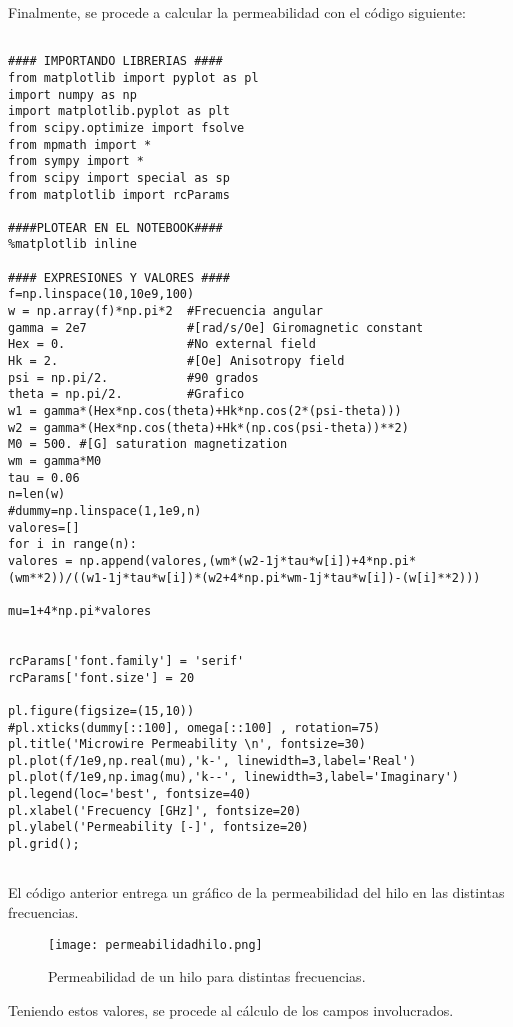 \documentclass[12pt,letterpaper]{article}
\numberwithin{equation}{section}
\begin{document}
Finalmente, se procede a calcular la permeabilidad con el código siguiente:

\begin{lstlisting}

#### IMPORTANDO LIBRERIAS ####
from matplotlib import pyplot as pl
import numpy as np
import matplotlib.pyplot as plt
from scipy.optimize import fsolve
from mpmath import *
from sympy import *
from scipy import special as sp
from matplotlib import rcParams

####PLOTEAR EN EL NOTEBOOK####
%matplotlib inline

#### EXPRESIONES Y VALORES ####
f=np.linspace(10,10e9,100) 
w = np.array(f)*np.pi*2  #Frecuencia angular
gamma = 2e7              #[rad/s/Oe] Giromagnetic constant
Hex = 0.                 #No external field
Hk = 2.                  #[Oe] Anisotropy field
psi = np.pi/2.           #90 grados
theta = np.pi/2.         #Grafico
w1 = gamma*(Hex*np.cos(theta)+Hk*np.cos(2*(psi-theta)))
w2 = gamma*(Hex*np.cos(theta)+Hk*(np.cos(psi-theta))**2)
M0 = 500. #[G] saturation magnetization
wm = gamma*M0
tau = 0.06               
n=len(w)
#dummy=np.linspace(1,1e9,n)
valores=[]
for i in range(n):
valores = np.append(valores,(wm*(w2-1j*tau*w[i])+4*np.pi*(wm**2))/((w1-1j*tau*w[i])*(w2+4*np.pi*wm-1j*tau*w[i])-(w[i]**2)))

mu=1+4*np.pi*valores


rcParams['font.family'] = 'serif'
rcParams['font.size'] = 20

pl.figure(figsize=(15,10))
#pl.xticks(dummy[::100], omega[::100] , rotation=75)
pl.title('Microwire Permeability \n', fontsize=30)
pl.plot(f/1e9,np.real(mu),'k-', linewidth=3,label='Real')
pl.plot(f/1e9,np.imag(mu),'k--', linewidth=3,label='Imaginary')
pl.legend(loc='best', fontsize=40)
pl.xlabel('Frecuency [GHz]', fontsize=20)
pl.ylabel('Permeability [-]', fontsize=20)
pl.grid();


\end{lstlisting}

El código anterior entrega un gráfico de la permeabilidad del hilo en las distintas frecuencias.

\begin{figure}[H]
	\centering\texttt{[image: permeabilidadhilo.png]}\\
	\caption{Permeabilidad de un hilo para distintas frecuencias.}
	\label{fig:permeabilidadhilo}
\end{figure} 


Teniendo estos valores, se procede al cálculo de los campos involucrados.
\end{document}
